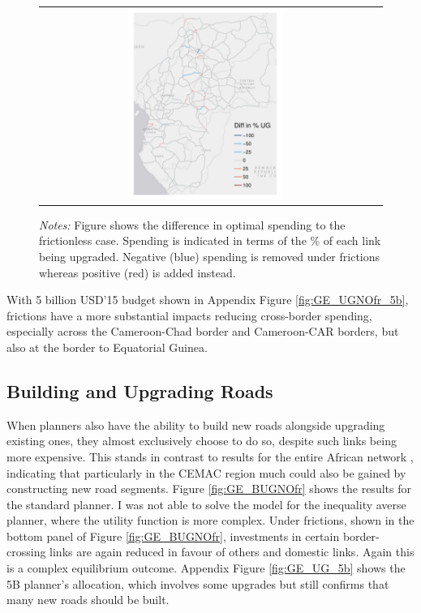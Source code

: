 \documentclass[a4paper]{article}
\begin{document}
\begin{figure}[H]
{\begin{tabular}{cc}
\includegraphics[width=0.48\textwidth]{"../figures/GE/trans_africa_network_GE_20g_2b_fixed_cgc_sigma3.8_rho2_julia_google_Ijk_bc_perc_ug_diff.pdf"}
\end{tabular}
}
\scriptsize 
\emph{Notes:} Figure shows the difference in optimal spending to the frictionless case. Spending is indicated in terms of the \% of each link being upgraded. Negative (blue) spending is removed under frictions whereas positive (red) is added instead. 
\end{figure}

With 5 billion USD'15 budget shown in Appendix Figure \ref{fig:GE_UGNOfr_5b}, frictions have a more substantial impacts reducing cross-border spending, especially across the Cameroon-Chad border and Cameroon-CAR borders, but also at the border to Equatorial Guinea. 


\subsection{Building and Upgrading Roads} 

When planners also have the ability to build new roads alongside upgrading existing ones, they almost exclusively choose to do so, despite such links being more expensive. This stands in contrast to results for the entire African network \citep{krantz2024optimal}, indicating that particularly in the CEMAC region much could also be gained by constructing new road segments. Figure \ref{fig:GE_BUGNOfr} shows the results for the standard planner. I was not able to solve the model for the inequality averse planner, where the utility function is more complex. Under frictions, shown in the bottom panel of Figure \ref{fig:GE_BUGNOfr}, investments in certain border-crossing links are again reduced in favour of others and domestic links. Again this is a complex equilibrium outcome. Appendix Figure \ref{fig:GE_UG_5b} shows the 5B planner's allocation, which involves some upgrades but still confirms that many new roads should be built. 
\end{document}
